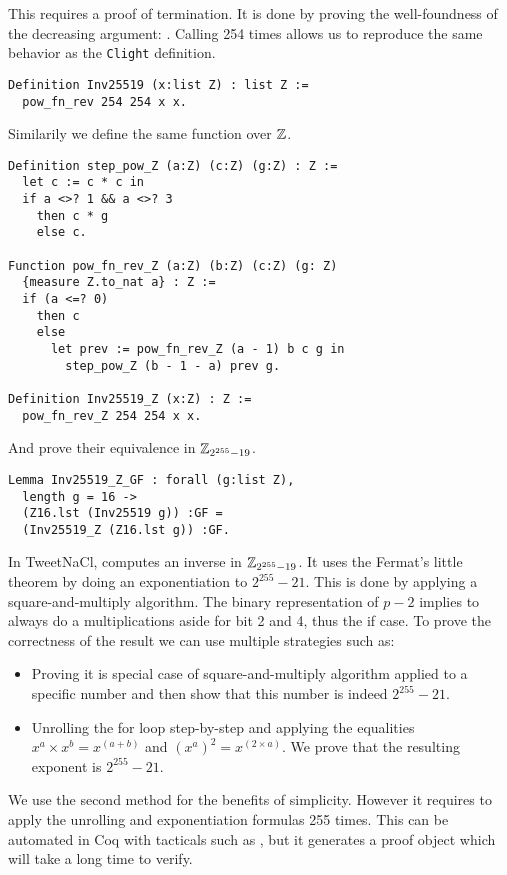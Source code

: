 This  requires a proof of termination. It is done by proving the
well-foundness of the decreasing argument: . Calling
 254 times allows us to reproduce the same behavior as the \texttt{Clight} definition.
\begin{lstlisting}[language=Coq]
Definition Inv25519 (x:list Z) : list Z :=
  pow_fn_rev 254 254 x x.
\end{lstlisting}
Similarily we define the same function over $\mathbb{Z}$.
\begin{lstlisting}[language=Coq]
Definition step_pow_Z (a:Z) (c:Z) (g:Z) : Z :=
  let c := c * c in
  if a <>? 1 && a <>? 3
    then c * g
    else c.

Function pow_fn_rev_Z (a:Z) (b:Z) (c:Z) (g: Z)
  {measure Z.to_nat a} : Z :=
  if (a <=? 0)
    then c
    else
      let prev := pow_fn_rev_Z (a - 1) b c g in
        step_pow_Z (b - 1 - a) prev g.

Definition Inv25519_Z (x:Z) : Z :=
  pow_fn_rev_Z 254 254 x x.
\end{lstlisting}
And prove their equivalence in $\mathbb{Z}_{2^{255}-19}$.
\begin{lstlisting}[language=Coq]
Lemma Inv25519_Z_GF : forall (g:list Z),
  length g = 16 ->
  (Z16.lst (Inv25519 g)) :GF =
  (Inv25519_Z (Z16.lst g)) :GF.
\end{lstlisting}
In TweetNaCl,  computes an inverse in $\mathbb{Z}_{2^{255}-19}$. It uses the
Fermat's little theorem by doing an exponentiation to $2^{255}-21$.
This is done by applying a square-and-multiply algorithm. The binary representation
of $p-2$ implies to always do a multiplications aside for bit 2 and 4, thus the if case.
To prove the correctness of the result we can use multiple strategies such as:
\begin{itemize}
  \item Proving it is special case of square-and-multiply algorithm applied to
  a specific number and then show that this number is indeed $2^{255}-21$.
  \item Unrolling the for loop step-by-step and applying the equalities
  $x^a \times x^b = x^{(a+b)}$ and $(x^a)^2 = x^{(2 \times a)}$. We prove that
  the resulting exponent is $2^{255}-21$.
\end{itemize}
We use the second method for the benefits of simplicity. However it requires to
apply the unrolling and exponentiation formulas 255 times. This can be automated
in Coq with tacticals such as , but it generates a proof object which
will take a long time to verify.

